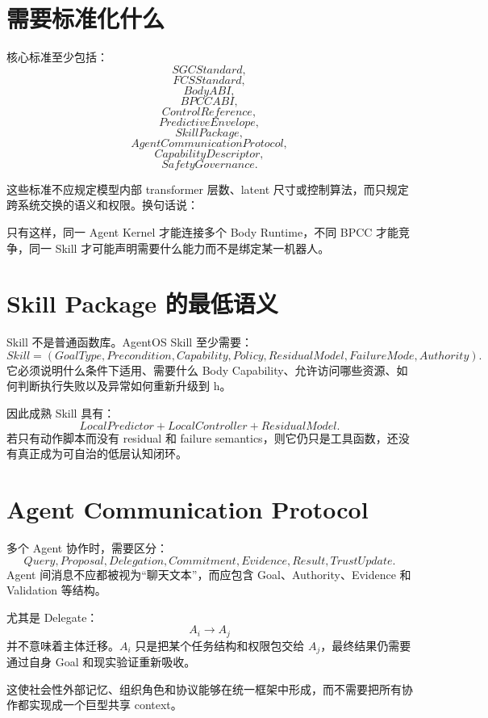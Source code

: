 \section{需要标准化什么}

核心标准至少包括：
\[
SGCStandard,
\]
\[
FCSStandard,
\]
\[
BodyABI,
\]
\[
BPCCABI,
\]
\[
ControlReference,
\]
\[
PredictiveEnvelope,
\]
\[
SkillPackage,
\]
\[
AgentCommunicationProtocol,
\]
\[
CapabilityDescriptor,
\]
\[
SafetyGovernance.
\]

这些标准不应规定模型内部 transformer 层数、latent 尺寸或控制算法，而只规定跨系统交换的语义和权限。换句话说：
\begin{statementbox}
\centering
{}
\end{statementbox}

只有这样，同一 Agent Kernel 才能连接多个 Body Runtime，不同 BPCC 才能竞争，同一 Skill 才可能声明需要什么能力而不是绑定某一机器人。

\section{Skill Package 的最低语义}

Skill 不是普通函数库。AgentOS Skill 至少需要：
\[
Skill=
(
GoalType,
Precondition,
Capability,
Policy,
ResidualModel,
FailureMode,
Authority
).
\]
它必须说明什么条件下适用、需要什么 Body Capability、允许访问哪些资源、如何判断执行失败以及异常如何重新升级到 h。

因此成熟 Skill 具有：
\[
LocalPredictor+LocalController+ResidualModel.
\]
若只有动作脚本而没有 residual 和 failure semantics，则它仍只是工具函数，还没有真正成为可自治的低层认知闭环。

\section{Agent Communication Protocol}

多个 Agent 协作时，需要区分：
\[
Query,
Proposal,
Delegation,
Commitment,
Evidence,
Result,
TrustUpdate.
\]
Agent 间消息不应都被视为“聊天文本”，而应包含 Goal、Authority、Evidence 和 Validation 等结构。

尤其是 Delegate：
\[
A_i\rightarrow A_j
\]
并不意味着主体迁移。$A_i$ 只是把某个任务结构和权限包交给 $A_j$，最终结果仍需要通过自身 Goal 和现实验证重新吸收。

这使社会性外部记忆、组织角色和协议能够在统一框架中形成，而不需要把所有协作都实现成一个巨型共享 context。

